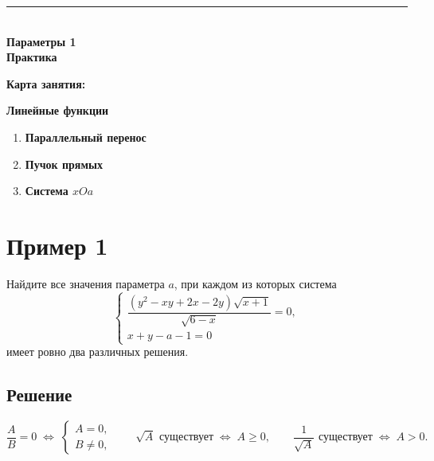 \documentclass[12pt,a4paper]{article}
\newcommand{\key}[1]{\textbf{\color{MCDark}#1}}
\newcommand{\eqv}{\;\Longleftrightarrow\;}
\begin{document}
\thispagestyle{titlepage}
\vspace*{8mm}
{\color{MCBlue}\rule{23mm}{2.2mm}}\\[8mm]
{\fontsize{32}{36}\selectfont\bfseries\color{MCDark}Параметры 1}\\[2mm]
{\fontsize{20}{24}\selectfont\color{MCBlue}\bfseries Практика}

\vspace{12mm}
{\Large\bfseries\color{MCDark}Карта занятия:}
\vspace{4mm}
\begin{tcolorbox}[colback=white,colframe=MCBlue!20,boxrule=.6pt,arc=4mm,left=6mm,right=6mm,top=6mm,bottom=6mm]
{\large\bfseries\color{MCBlue}Линейные функции}\par\vspace{3mm}
\begin{enumerate}[label={\color{MCBlue}\bfseries\arabic*.},leftmargin=9mm,itemsep=7pt]
  \item \key{Параллельный перенос}
  \item \key{Пучок прямых}
  \item \key{Система $xOa$}
\end{enumerate}
\end{tcolorbox}
\vfill
\newpage

\Needspace{55mm}\section{Пример 1}
\begin{problemBox}
Найдите все значения параметра $a$, при каждом из которых система
\[
\begin{cases}
\dfrac{(y^2-xy+2x-2y)\sqrt{x+1}}{\sqrt{6-x}}=0,\\[2mm]
x+y-a-1=0
\end{cases}
\]
имеет ровно два различных решения.
\end{problemBox}

\subsection{Решение}
\begin{tipBox}
\[
\frac{A}{B}=0\eqv\begin{cases}A=0,\\B\ne0,\end{cases}
\qquad
\sqrt A\text{ существует}\eqv A\ge0,
\qquad
\frac1{\sqrt A}\text{ существует}\eqv A>0.
\]
\end{tipBox}
\end{document}
